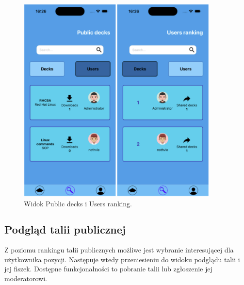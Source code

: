 \begin{figure}[H]
    \centering
    \includegraphics[width=0.9\textwidth]{chapters/chapter_10/images_mobile/mobile_ranking}
    \caption{Widok Public decks i Users ranking.}
    \label{img:mobile_ranking}
\end{figure}


\subsection{Podgląd talii publicznej}
Z poziomu rankingu talii publicznych możliwe jest wybranie interesującej dla użytkownika pozycji. Następuje wtedy przeniesieniu do widoku podglądu talii i jej fiszek. Dostępne funkcjonalności to pobranie talii lub zgłoszenie jej moderatorowi.


